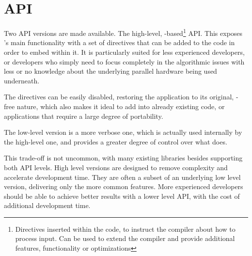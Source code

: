 \documentclass[main.tex]{subfiles}
\begin{document}
\section{API}

Two API versions are made available. The high-level, -based\footnote{Directives inserted within the code, to instruct the compiler about how to process input. Can be used to extend the compiler and provide additional features, functionality or optimizations} API. This exposes \starpu's main functionality with a set of directives that can be added to the code in order to embed \starpu within it. It is particularly suited for less experienced developers, or developers who simply need to focus completely in the algorithmic issues with less or no knowledge about the underlying parallel hardware being used underneath.

The directives can be easily disabled, restoring the application to its original, \starpu-free nature, which also makes it ideal to add \starpu into already existing code, or applications that require a large degree of portability.

The low-level version is a more verbose one, which is actually used internally by the high-level one, and provides a greater degree of control over what \starpu does.

This trade-off is not uncommon, with many existing libraries besides \starpu supporting both API levels. High level versions are designed to remove complexity and accelerate development time. They are often a subset of an underlying low level version, delivering only the more common features. More experienced developers should be able to achieve better results with a lower level API, with the cost of additional development time.
\end{document}
